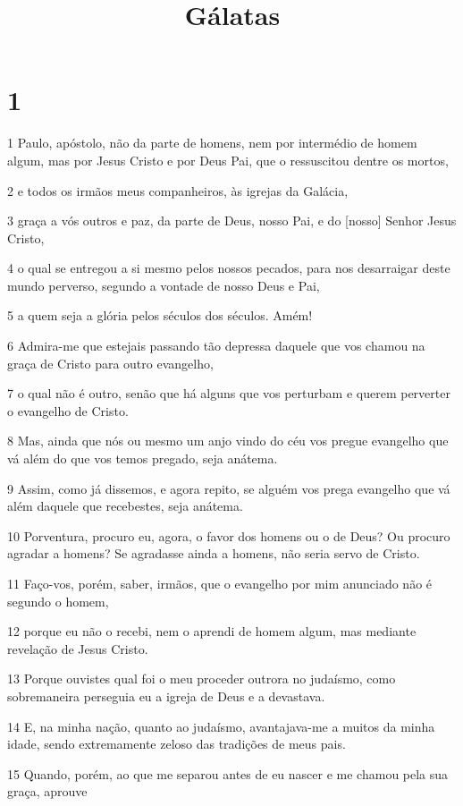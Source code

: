 

\title{Gálatas}


\chapter{1}

\par 1 Paulo, apóstolo, não da parte de homens, nem por intermédio de homem algum, mas por Jesus Cristo e por Deus Pai, que o ressuscitou dentre os mortos,
\par 2 e todos os irmãos meus companheiros, às igrejas da Galácia,
\par 3 graça a vós outros e paz, da parte de Deus, nosso Pai, e do [nosso] Senhor Jesus Cristo,
\par 4 o qual se entregou a si mesmo pelos nossos pecados, para nos desarraigar deste mundo perverso, segundo a vontade de nosso Deus e Pai,
\par 5 a quem seja a glória pelos séculos dos séculos. Amém!
\par 6 Admira-me que estejais passando tão depressa daquele que vos chamou na graça de Cristo para outro evangelho,
\par 7 o qual não é outro, senão que há alguns que vos perturbam e querem perverter o evangelho de Cristo.
\par 8 Mas, ainda que nós ou mesmo um anjo vindo do céu vos pregue evangelho que vá além do que vos temos pregado, seja anátema.
\par 9 Assim, como já dissemos, e agora repito, se alguém vos prega evangelho que vá além daquele que recebestes, seja anátema.
\par 10 Porventura, procuro eu, agora, o favor dos homens ou o de Deus? Ou procuro agradar a homens? Se agradasse ainda a homens, não seria servo de Cristo.
\par 11 Faço-vos, porém, saber, irmãos, que o evangelho por mim anunciado não é segundo o homem,
\par 12 porque eu não o recebi, nem o aprendi de homem algum, mas mediante revelação de Jesus Cristo.
\par 13 Porque ouvistes qual foi o meu proceder outrora no judaísmo, como sobremaneira perseguia eu a igreja de Deus e a devastava.
\par 14 E, na minha nação, quanto ao judaísmo, avantajava-me a muitos da minha idade, sendo extremamente zeloso das tradições de meus pais.
\par 15 Quando, porém, ao que me separou antes de eu nascer e me chamou pela sua graça, aprouve
